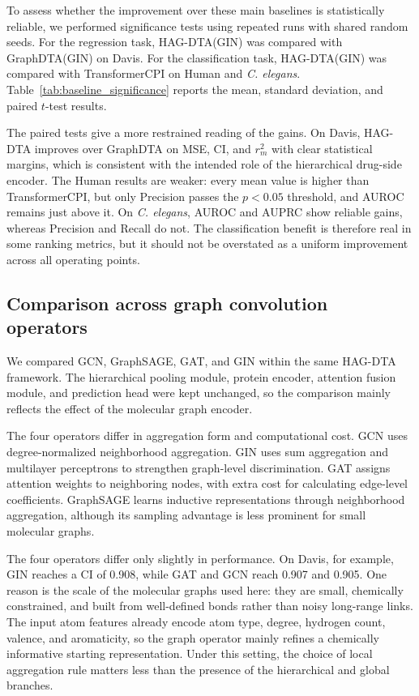 \documentclass[pdflatex,sn-mathphys-num]{sn-jnl}%
\theoremstyle{thmstyleone}%
\theoremstyle{thmstyletwo}%
\theoremstyle{thmstylethree}%
\begin{document}
To assess whether the improvement over these main baselines is statistically reliable, we performed significance tests using repeated runs with shared random seeds. For the regression task, HAG-DTA(GIN) was compared with GraphDTA(GIN) on Davis. For the classification task, HAG-DTA(GIN) was compared with TransformerCPI on Human and \textit{C. elegans}. Table~\ref{tab:baseline_significance} reports the mean, standard deviation, and paired $t$-test results.

The paired tests give a more restrained reading of the gains. On Davis, HAG-DTA improves over GraphDTA on MSE, CI, and $r_m^2$ with clear statistical margins, which is consistent with the intended role of the hierarchical drug-side encoder. The Human results are weaker: every mean value is higher than TransformerCPI, but only Precision passes the $p<0.05$ threshold, and AUROC remains just above it. On \textit{C. elegans}, AUROC and AUPRC show reliable gains, whereas Precision and Recall do not. The classification benefit is therefore real in some ranking metrics, but it should not be overstated as a uniform improvement across all operating points.

\subsection{Comparison across graph convolution operators}

We compared GCN, GraphSAGE, GAT, and GIN within the same HAG-DTA framework. The hierarchical pooling module, protein encoder, attention fusion module, and prediction head were kept unchanged, so the comparison mainly reflects the effect of the molecular graph encoder.

The four operators differ in aggregation form and computational cost. GCN\cite{kipf2016semi} uses degree-normalized neighborhood aggregation. GIN\cite{xu2018powerful} uses sum aggregation and multilayer perceptrons to strengthen graph-level discrimination. GAT\cite{velivckovic2017graph} assigns attention weights to neighboring nodes, with extra cost for calculating edge-level coefficients. GraphSAGE\cite{hamilton2017inductive} learns inductive representations through neighborhood aggregation, although its sampling advantage is less prominent for small molecular graphs.

The four operators differ only slightly in performance. On Davis, for example, GIN reaches a CI of 0.908, while GAT and GCN reach 0.907 and 0.905. One reason is the scale of the molecular graphs used here: they are small, chemically constrained, and built from well-defined bonds rather than noisy long-range links. The input atom features already encode atom type, degree, hydrogen count, valence, and aromaticity, so the graph operator mainly refines a chemically informative starting representation. Under this setting, the choice of local aggregation rule matters less than the presence of the hierarchical and global branches.
\end{document}
